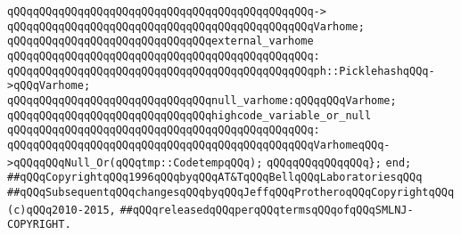 \verb|qQQqqQQqqQQqqQQqqQQqqQQqqQQqqQQqqQQqqQQqqQQqqQQq->|\newline
\verb|qQQqqQQqqQQqqQQqqQQqqQQqqQQqqQQqqQQqqQQqqQQqqQQqVarhome;|\newline
\newline
\newline
\verb|qQQqqQQqqQQqqQQqqQQqqQQqqQQqqQQqexternal_varhome|\newline
\verb|qQQqqQQqqQQqqQQqqQQqqQQqqQQqqQQqqQQqqQQqqQQqqQQq:|\newline
\verb|qQQqqQQqqQQqqQQqqQQqqQQqqQQqqQQqqQQqqQQqqQQqqQQqph::PicklehashqQQq->qQQqVarhome;|\newline
\newline
\verb|qQQqqQQqqQQqqQQqqQQqqQQqqQQqqQQqnull_varhome:qQQqqQQqVarhome;|\newline
\newline
\verb|qQQqqQQqqQQqqQQqqQQqqQQqqQQqqQQqhighcode_variable_or_null|\newline
\verb|qQQqqQQqqQQqqQQqqQQqqQQqqQQqqQQqqQQqqQQqqQQqqQQq:|\newline
\verb|qQQqqQQqqQQqqQQqqQQqqQQqqQQqqQQqqQQqqQQqqQQqqQQqVarhomeqQQq->qQQqqQQqNull_Or(qQQqtmp::CodetempqQQq);|\newline
\verb|qQQqqQQqqQQqqQQq};|\newline
\verb|end;|\newline
\newline
\verb|##qQQqCopyrightqQQq1996qQQqbyqQQqAT&TqQQqBellqQQqLaboratoriesqQQq|\newline
\verb|##qQQqSubsequentqQQqchangesqQQqbyqQQqJeffqQQqProtheroqQQqCopyrightqQQq(c)qQQq2010-2015,|\newline
\verb|##qQQqreleasedqQQqperqQQqtermsqQQqofqQQqSMLNJ-COPYRIGHT.|\newline


